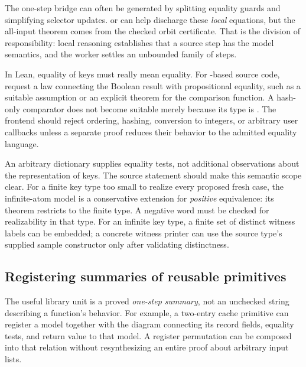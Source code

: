 The one-step bridge can often be generated by splitting equality guards and
simplifying selector updates.  or  can help discharge
these \emph{local} equations, but the all-input theorem comes from the checked
orbit certificate. That is the division of responsibility: local reasoning
establishes that a source step has the model semantics, and the worker settles
an unbounded family of steps.

In Lean, equality of keys must really mean equality. For -based source
code, request a law connecting the Boolean result with propositional equality,
such as a suitable  assumption or an explicit theorem for the
comparison function. A hash-only comparator does not become suitable merely
because its type is . The frontend should reject
ordering, hashing, conversion to integers, or arbitrary user callbacks unless a
separate proof reduces their behavior to the admitted equality language.

An arbitrary  dictionary supplies equality tests, not
additional observations about the representation of keys. The source statement
should make this semantic scope clear. For a finite key type too small to
realize every proposed fresh case, the infinite-atom model is a conservative
extension for \emph{positive} equivalence: its theorem restricts to the finite
type. A negative word must be checked for realizability in that type. For an
infinite key type, a finite set of distinct witness labels can be embedded; a
concrete witness printer can use the source type's supplied sample constructor
only after validating distinctness.

\subsection{Registering summaries of reusable primitives}
The useful library unit is a proved \emph{one-step summary}, not an unchecked
string describing a function's behavior. For example, a two-entry cache
primitive can register a model together with the diagram connecting its
record fields, equality tests, and return value to that model. A register
permutation can be composed into that relation without resynthesizing an
entire proof about arbitrary input lists.

